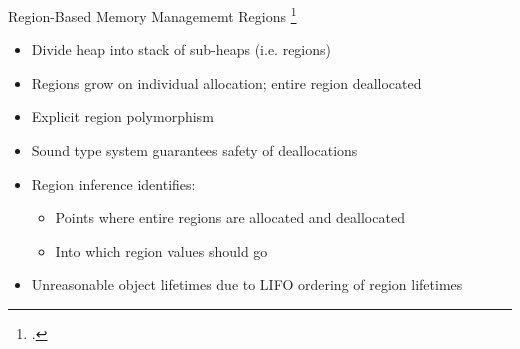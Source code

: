 \documentclass[aspectratio=169]{beamer}
\begin{document}

\begin{frame}{Region-Based Memory Managememt}
    Regions \footcite{tofte_region-based_1997}
    \begin{itemize}[<+->]
        \item Divide heap into stack of sub-heaps (i.e. regions) 
        \item Regions grow on individual allocation; \alert{entire} region deallocated 
        \item Explicit region polymorphism 
        \item Sound type system \alert{guarantees safety} of deallocations 
        \item Region inference identifies:
            \begin{itemize}
                \item Points where entire regions are allocated and deallocated
                \item Into which region values should go
            \end{itemize}
        \item Unreasonable object lifetimes due to LIFO ordering of region lifetimes %
    \end{itemize}
    \vspace{0.1in}
\end{frame}
\end{document}
